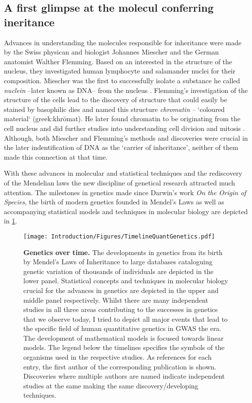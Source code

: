 \subsection{A first glimpse at the molecul conferring ineritance}
Advances in understanding the molecules responsible for inheritance were made by the Swiss physican and biologist Johannes Miescher and the German anatomist Walther Flemming. Based on an interested in the structure of the nucleus, they investigated human lymphocyte and salamander nuclei for their composition. Miescher was the first to successfully isolate 
a substance he called \textit{nuclein} --later known as DNA-- from the nucleus \citep{Miescher1971}. Flemming's investigation of the structure of the cells lead to the discovery of structure that could easily be stained by basophilic dies and named this structure \textit{chromatin} --  `coloured material` (greek:khrōmat). He later found chromatin to be originating from the cell nucleus and did further studies into understanding cell division and mitosis \citep{Flemming1978}. Although, both Miescher and Flemming's methods and discoveries were crucial in the later indentification of DNA as the `carrier of inheritance', neither of them made this connection at that time. 

With these advances in molecular and statistical techniques and the rediscovery of the Mendelian laws the new discipline of genetical research attracted much attention. The  milestones in genetics made since Darwin's work \textit{On the Origin of Species}, the birth of modern genetics founded in Mendel's Laws as well as accompanying statistical models and techniques in molecular biology are depicted in \cref{fig:timeline-genetics}.

\begin{figure}[hbtp]
	\centering
	\texttt{[image: Introduction/Figures/TimelineQuantGenetics.pdf]}
	\caption[\textbf{Genetics over time. }]{\textbf{Genetics over time. }  The developments in genetics from its birth by Mendel's Laws of Inheritance to large databases cataloguing genetic variation of thousands of individuals are depicted in the lower panel. Statistical concepts and techniques in molecular biology crucial for the advances in genetics are depicted in the upper and middle panel respectively. Whilst there are many independent studies in all three areas contributing to the successes in genetics that we observe today, I tried to depict all major events that lead to the specific field of human quantitative genetics in GWAS the era. The development of mathematical models is focused towards linear models. The legend below the timelines specifies the symbols of the organisms used in the respective studies. As references for each entry, the first author of the corresponding publication is shown. Discoveries where multiple authors are named indicate independent studies at the same making the same discovery/developing techniques. } 
	 	\label{fig:timeline-genetics}
\end{figure}

